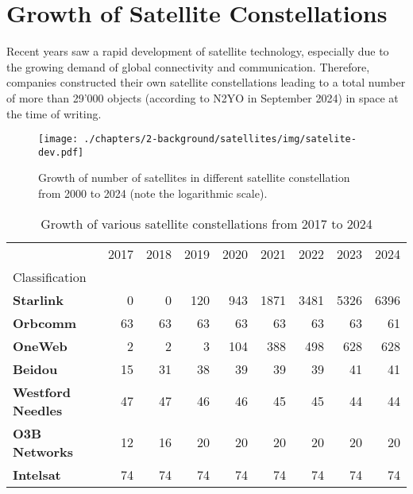 \section{Growth of Satellite Constellations} \label{sec:satellite-constellations}

Recent years saw a rapid development of satellite technology, especially due to
the growing demand of global connectivity and communication. Therefore,
companies constructed their own satellite constellations leading to a total
number of more than 29'000 objects (according to N2YO in September 2024) in
space at the time of writing.

\begin{figure}[ht]
	\texttt{[image: ./chapters/2-background/satellites/img/satelite-dev.pdf]}
	\caption{Growth of number of satellites in different satellite constellation from 2000 to 2024 (note the logarithmic scale).}
	\label{fig:growth-satellite-constellations}
\end{figure}

\begin{table}
	\caption{Growth of various satellite constellations from 2017 to 2024}
	\label{fig:satellite-constellations-short}
	\begin{tabular}{lrrrrrrrr}
		\toprule
		                          & 2017 & 2018 & 2019 & 2020 & 2021 & 2022 & 2023 & 2024 \\
		Classification            &      &      &      &      &      &      &      &      \\
		\midrule
		\textbf{Starlink}         & 0    & 0    & 120  & 943  & 1871 & 3481 & 5326 & 6396 \\
		\textbf{Orbcomm}          & 63   & 63   & 63   & 63   & 63   & 63   & 63   & 61   \\
		\textbf{OneWeb}           & 2    & 2    & 3    & 104  & 388  & 498  & 628  & 628  \\
		\textbf{Beidou}           & 15   & 31   & 38   & 39   & 39   & 39   & 41   & 41   \\
		\textbf{Westford Needles} & 47   & 47   & 46   & 46   & 45   & 45   & 44   & 44   \\
		\textbf{O3B Networks}     & 12   & 16   & 20   & 20   & 20   & 20   & 20   & 20   \\
		\textbf{Intelsat}         & 74   & 74   & 74   & 74   & 74   & 74   & 74   & 74   \\
		\bottomrule
	\end{tabular}
\end{table}


